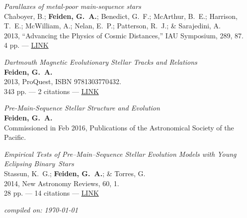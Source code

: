 \documentclass[11pt,a4paper]{article}
\begin{document}
\begin{etaremune}[leftmargin=0.30in]
    \item \emph{Parallaxes of metal-poor main-sequence stars} \\
    Chaboyer, B.; {\bf Feiden, G.~A.}; Benedict, G.~F.; McArthur, B.~E.; Harrison, T.~E.; McWilliam, A.; Nelan, E.~P.; Patterson, R.~J.; \& Sarajedini, A. \\
    2013, ``Advancing the Physics of Cosmic Distances,'' IAU Symposium, 289, 87. \\
    4 pp. --- \href{http://adsabs.harvard.edu/abs/2013IAUS..289...87C}{LINK}
\end{etaremune}

\vspace{\baselineskip}

\begin{etaremune}[leftmargin=0.30in]
	\item \emph{Dartmouth Magnetic Evolutionary Stellar Tracks and Relations} \\
		{\bf Feiden, G.~A.} \\
		2013, ProQuest, ISBN 9781303770432. \\
		343 pp. --- 2 citations --- \href{http://adsabs.harvard.edu/abs/2013PhDT.......149F}{LINK}
\end{etaremune}

\vspace{\baselineskip}


\begin{etaremune}[leftmargin=0.30in]
	\item \emph{Pre-Main-Sequence Stellar Structure and Evolution} \\
		{\bf Feiden, G.~A.} \\
		Commissioned in Feb 2016, Publications of the Astronomical Society of the Pacific. 
		
	\item {\it Empirical Tests of Pre--Main--Sequence Stellar Evolution Models with Young Eclipsing Binary~Stars} \\
          Stassun, K.~G.; {\bf Feiden, G.~A.}; \& Torres, G. \\
          2014, New Astronomy Reviews, 60, 1. \\
          28 pp. --- 14 citations --- \href{http://adsabs.harvard.edu/abs/2014NewAR..60....1S}{LINK}
\end{etaremune}

%
%
%	

\vspace{\baselineskip}

\begin{flushright}
	\emph{\footnotesize compiled on: \today}
\end{flushright}
\end{document}
